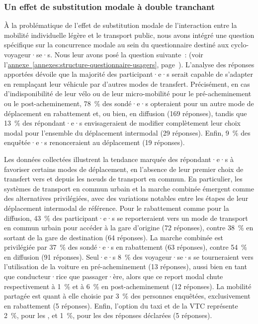 \begin{refsegment}
\subsubsection*{Un effet de substitution modale à double tranchant
    \label{chap4:substitution-modale-double-tranchant}
    }

À la problématique de l'effet de substitution modale de l'interaction entre la mobilité individuelle légère et le transport public, nous avons intégré une question spécifique sur la concurrence modale au sein du questionnaire destiné aux cyclo-voyageur·se·s. Nous leur avons posé la question suivante~:  (voir l'\hyperref[annexes:structure-questionnaire-usagers]{annexe~\ref{annexes:structure-questionnaire-usagers}}, page~\pageref{annexes:structure-questionnaire-usagers}). L'analyse des réponses apportées dévoile que la majorité des participant·e·s serait capable de s'adapter en remplaçant leur véhicule par d'autres modes de transfert. Précisément, en cas d'indisponibilité de leur vélo ou de leur micro-mobilité pour le pré-acheminement ou le post-acheminement, 78~\% des sondé·e·s opteraient pour un autre mode de déplacement en rabattement et, ou bien, en diffusion (169 réponses), tandis que 13~\% des répondant·e·s envisageraient de modifier complètement leur choix modal pour l'ensemble du déplacement intermodal (29 réponses). Enfin, 9~\% des enquêtée·e·s renonceraient au déplacement (19 réponses).%

Les données collectées illustrent la tendance marquée des répondant·e·s à favoriser certains modes de déplacement, en l'absence de leur premier choix de transfert vers et depuis les nœuds de transport en commun. En particulier, les systèmes de transport en commun urbain et la marche combinée émergent comme des alternatives privilégiées, avec des variations notables entre les étapes de leur déplacement intermodal de référence. Pour le rabattement comme pour la diffusion, 43~\% des participant·e·s se reporteraient vers un mode de transport en commun urbain pour accéder à la gare d'origine (72 réponses), contre 38~\% en sortant de la gare de destination (64 réponses). La marche combinée est privilégiée par 37~\% des sondé·e·s en rabattement (63 réponses), contre 54~\% en diffusion (91 réponses). Seul·e·s 8~\% des voyageur·se·s se tourneraient vers l'utilisation de la voiture en pré-acheminement (13 réponses), aussi bien en tant que conducteur·rice que passager·ère, alors que ce report modal chute respectivement à 1~\% et à 6~\% en post-acheminement (12 réponses). La mobilité partagée est quant à elle choisie par 3~\% des personnes enquêtées, exclusivement en rabattement (5 réponses). Enfin, l'option du taxi et de la \acrfull{VTC} représente 2~\%, pour les , et 1~\%, pour les  des réponses déclarées (5 réponses).%


\end{refsegment}
